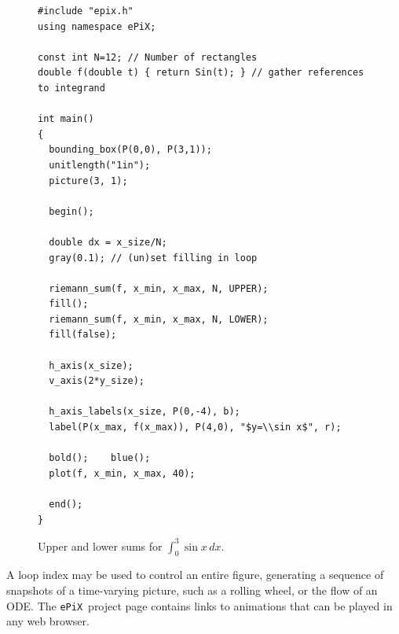 \documentclass[11pt]{article}
\newcommand{\ePiX}{\texttt{ePiX}}
\begin{document}
\begin{figure}[hbt]
\begin{center}

\vspace*{-1in}
\begin{small}
\begin{verbatim}
#include "epix.h"
using namespace ePiX;

const int N=12; // Number of rectangles
double f(double t) { return Sin(t); } // gather references to integrand

int main() 
{
  bounding_box(P(0,0), P(3,1));
  unitlength("1in");
  picture(3, 1);

  begin();

  double dx = x_size/N;
  gray(0.1); // (un)set filling in loop

  riemann_sum(f, x_min, x_max, N, UPPER);
  fill();
  riemann_sum(f, x_min, x_max, N, LOWER);
  fill(false);

  h_axis(x_size);
  v_axis(2*y_size);

  h_axis_labels(x_size, P(0,-4), b);
  label(P(x_max, f(x_max)), P(4,0), "$y=\\sin x$", r);

  bold();    blue();
  plot(f, x_min, x_max, 40);

  end();
}

\end{verbatim}
\end{small}
\caption{Upper and lower sums for $\displaystyle\int_0^3\sin x\,dx$.}
\label{fig:uppersum}
\end{center}
\end{figure}

\clearpage

A loop index may be used to control an entire figure, generating a
sequence of snapshots of a time-varying picture, such as a rolling
wheel, or the flow of an ODE. The \ePiX\ project page contains links
to animations that can be played in any web browser.
\end{document}
